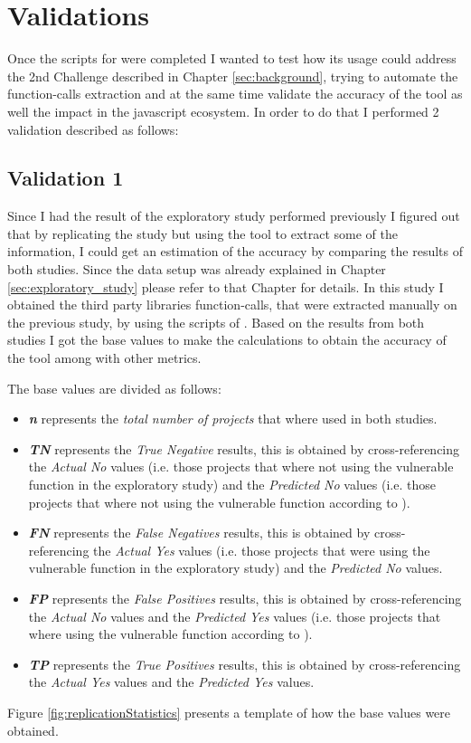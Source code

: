 \chapter{Validations}
\label{sec:validations}

Once the scripts for \tool[] were completed I wanted to test how its usage could address the 2nd Challenge described in Chapter \ref{sec:background}, trying to automate the function-calls extraction and at the same time validate the accuracy of the tool as well the impact in the javascript ecosystem. In order to do that I performed 2 validation described as follows:

\section{Validation 1}

Since I had the result of the exploratory study performed previously I figured out that by replicating the study but using the tool to extract some of the information, I could get an estimation of the accuracy by comparing the results of both studies.
Since the data setup was already explained in Chapter \ref{sec:exploratory_study} please refer to that Chapter for details.
In this study I obtained the third party libraries function-calls, that were extracted manually on the previous study, by using the scripts of \tool[]. Based on the results from both studies I got the base values to make the calculations to obtain the accuracy of the tool among with other metrics. 

The base values are divided as follows:
\begin{itemize}
    \item \textbf{\textit{n}} represents the \textit{total number of projects} that where used in both studies.
    \item \textbf{\textit{TN}} represents the \textit{True Negative} results, this is obtained by cross-referencing the \textit{Actual No} values (i.e. those projects that where not using the vulnerable function in the exploratory study) and the \textit{Predicted No} values (i.e. those projects that where not using the vulnerable function according to \tool[]). 
    \item \textbf{\textit{FN}} represents the \textit{False Negatives} results, this is obtained by cross-referencing the \textit{Actual Yes} values (i.e. those projects that were using the vulnerable function in the exploratory study) and the \textit{Predicted No} values. 
    \item \textbf{\textit{FP}} represents the \textit{False Positives} results, this is obtained by cross-referencing the \textit{Actual No} values and the \textit{Predicted Yes} values (i.e. those projects that where using the vulnerable function according to \tool[]).
    \item \textbf{\textit{TP}} represents the \textit{True Positives} results, this is obtained by cross-referencing the \textit{Actual Yes} values and the \textit{Predicted Yes} values.
\end{itemize}
Figure \ref{fig:replicationStatistics} presents a template of how the base values were obtained.

